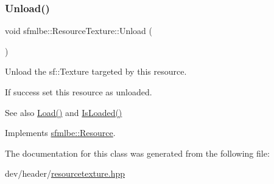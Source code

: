 \subsubsection{\texorpdfstring{Unload()}{Unload()}}
{\footnotesize\ttfamily void sfmlbe\+::\+Resource\+Texture\+::\+Unload (\begin{DoxyParamCaption}{ }\end{DoxyParamCaption})\hspace{0.3cm}{\ttfamily [virtual]}}



Unload the sf\+::\+Texture targeted by this resource. 

If success set this resource as unloaded. \begin{DoxySeeAlso}{See also}
\mbox{\hyperlink{classsfmlbe_1_1_resource_texture_a4f8d27c8e50efce6d66a30edb078e2d3}{Load()}} and \mbox{\hyperlink{classsfmlbe_1_1_resource_acd0812c81f7d5d851a4671f0cf7bb4f1}{Is\+Loaded()}} 
\end{DoxySeeAlso}


Implements \mbox{\hyperlink{classsfmlbe_1_1_resource_a48c75a88679cf457965dd013f47014b9}{sfmlbe\+::\+Resource}}.



The documentation for this class was generated from the following file\+:\begin{DoxyCompactItemize}
\item 
dev/header/\mbox{\hyperlink{resourcetexture_8hpp}{resourcetexture.\+hpp}}\end{DoxyCompactItemize}

